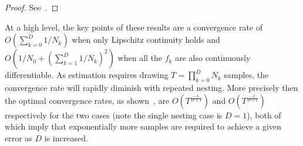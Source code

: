 \vspace{-12pt}
\begin{proof}
	See~\citep{rainforth2017pitfalls}.
\end{proof}
\noindent At a high level, the key points of these results are a convergence rate of $O(\sum_{k=0}^{D} 1/N_k)$
when only Lipschitz continuity holds and $O(1/N_0 +(\sum_{k=1}^{D} 1/N_k)^2)$ when
all the $f_k$ are also continuously differentiable.  
As estimation requires drawing $T = \prod_{k=0}^{D} N_k$ samples, 
the convergence rate will rapidly diminish with repeated nesting.  More precisely then the optimal convergence rates,
as shown~\cite{rainforth2017pitfalls}, are
$O(T^{\frac{-1}{D+1}})$ and $O(T^{\frac{-2}{D+2}})$ respectively for the two cases (note the single nesting case 
is $D=1$), both of which
imply that exponentially more samples are required to achieve a given error as $D$ is increased.
